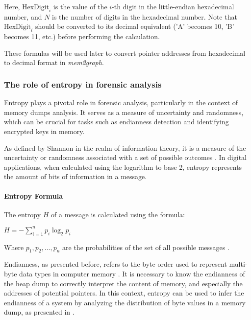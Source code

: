     Here, $ \text{HexDigit}_{i} $ is the value of the \(i\)-th digit in the little-endian hexadecimal number, and \( N \) is the number of digits in the hexadecimal number. Note that $ \text{HexDigit}_{i} $ should be converted to its decimal equivalent ('A' becomes 10, 'B' becomes 11, etc.) before performing the calculation.

    These formulas will be used later to convert pointer addresses from hexadecimal to decimal format in \textit{mem2graph}.

    \subsubsection{The role of entropy in forensic analysis}

    Entropy plays a pivotal role in forensic analysis, particularly in the context of memory dumps analysis. It serves as a measure of uncertainty and randomness, which can be crucial for tasks such as endianness detection and identifying encrypted keys in memory.

    As defined by Shannon in the realm of information theory, it is a measure of the uncertainty or randomness associated with a set of possible outcomes \cite{InferenceEndianness17}. In digital applications, when calculated using the logarithm to base 2, entropy represents the amount of bits of information in a message.

    \begin{minipage}{\dimexpr\linewidth-20pt}
        \paragraph{Entropy Formula}
        The entropy \( H \) of a message is calculated using the formula:
        \par %
        
        \vspace{2em}  %
        \begin{center}
            $
            H = - \sum_{i=1}^{n} p_i \log_2 p_i
            $
        \end{center}
        \vspace{1em}

        Where $ p_1, p_2, \ldots, p_n $ are the probabilities of the set of all possible messages \cite{InferenceEndianness17}.
    \end{minipage}

    Endianness, as presented before, refers to the byte order used to represent multi-byte data types in computer memory \cite{InferenceEndianness17}. It is necessary to know the endianness of the heap dump to correctly interpret the content of memory, and especially the addresses of potential pointers. In this context, entropy can be used to infer the endianness of a system by analyzing the distribution of byte values in a memory dump, as presented in  \cite{InferenceEndianness17}.

